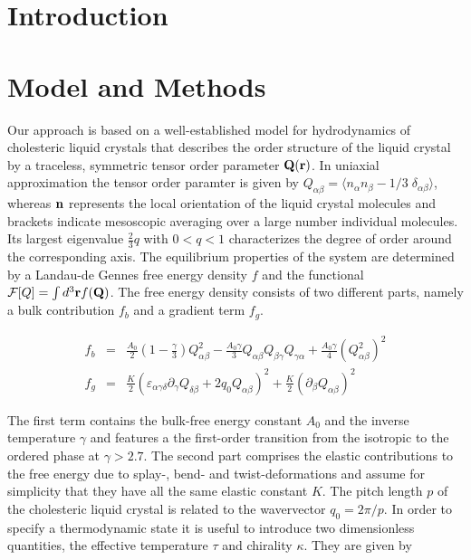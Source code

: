 \documentclass[aps,pre,onecolumn,groupedaddress]{revtex4-1}
\begin{document}
\section{Introduction}
\section{Model and Methods}

Our approach is based on a well-established model for hydrodynamics of cholesteric liquid crystals \cite{Beris:1994,Olmsted:1999} that describes the order structure of the liquid crystal by a traceless, symmetric tensor order parameter ${\bf Q}({\bf r})$. 
In uniaxial approximation the tensor order paramter is given by $Q_{\alpha \beta}=\langle n_\alpha n_\beta - 1/3\; \delta_{\alpha\beta}\rangle$, whereas ${\bf n}$ represents the local orientation of the liquid crystal molecules and brackets indicate mesoscopic averaging over a large number individual molecules.
Its largest eigenvalue $\frac{2}{3}q$ with $0<q<1$ characterizes the degree of order around the corresponding axis. 
The equilibrium properties of the system are determined by a Landau-de Gennes free energy density $f$ and the functional ${\cal F}[Q]=\int d^3{\bf r} f({\bf Q})$.
The free energy density consists of two different parts, namely a bulk contribution $f_b$ and a gradient term $f_g$.

\begin{eqnarray}
f_b&=&\frac{A_0}{2}\left(1-\frac{\gamma}{3}\right) Q_{\alpha \beta}^2-\frac{A_0 \gamma}{3}Q_{\alpha \beta} Q_{\beta \gamma} Q_{\gamma \alpha}+\frac{A_0 \gamma}{4}(Q_{\alpha \beta}^2)^2\nonumber\\
f_g&=&\frac{K}{2}(\varepsilon_{\alpha\gamma\delta} \partial_\gamma Q_{\delta\beta}+2 q_0 Q_{\alpha \beta})^2+\frac{K}{2}(\partial_\beta Q_{\alpha \beta})^2\label{eqn1}
\end{eqnarray}

The first term contains the bulk-free energy constant $A_0$ and the inverse temperature $\gamma$ and features a the first-order transition from the isotropic to the ordered phase at $\gamma>2.7$.
The second part comprises the elastic contributions to the free energy due to splay-, bend- and twist-deformations and assume for simplicity that they have all the same elastic constant $K$.
The pitch length $p$ of the cholesteric liquid crystal is related to the wavervector $q_0=2\pi/p$.
In order to specify a thermodynamic state it is useful to introduce two dimensionless quantities, the effective temperature $\tau$ and chirality $\kappa$.
They are given by 
\end{document}
